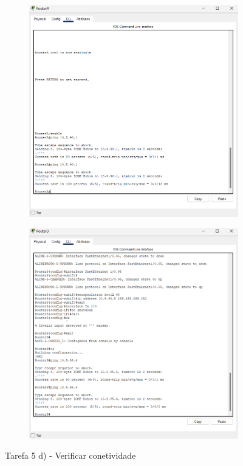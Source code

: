 \documentclass[11pt,english, openright, oneside]{book}
\begin{document}
\begin{figure}[h]
    \centering
    \begin{subfigure}{.53\textwidth}
        \centering
        \includegraphics[width=0.99\linewidth]{imagens/Tarefa5/5.d.1.png}
    \end{subfigure}%
    \begin{subfigure}{.53\textwidth}
        \centering
        \includegraphics[width=0.99\linewidth]{imagens/Tarefa5/5.d.2.png}
    \end{subfigure}
    \caption{Tarefa 5 d) - Verificar conetividade}
    \label{fig:5.d}
\end{figure}
\vspace{0.8cm}
\end{document}
